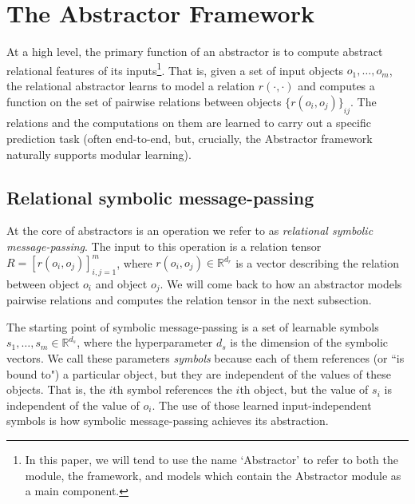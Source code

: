 
\def\m{m}


\section{The Abstractor Framework}
\label{sec:abstractor_framework}

At a high level, the primary function of an abstractor is to compute abstract relational features of its
inputs\footnote{In this paper, we will tend to use the name `Abstractor' to refer to both the module, the framework, and models which contain the Abstractor module as a main component.}. That is, given a set of input objects $o_1, \ldots, o_\m$, the relational abstractor learns to model a relation $r(\cdot, \cdot)$ and computes a function on
the set of pairwise relations between objects ${\{ r(o_i, o_j) \}}_{ij}$. The relations and the computations on them are learned to carry out a specific prediction task (often end-to-end, but, crucially, the Abstractor framework naturally supports modular learning).
\subsection{Relational symbolic message-passing}
\label{ssec:message_passing}

At the core of abstractors is an operation we refer to as \textit{relational symbolic message-passing}.
The input to this operation is a relation tensor $R = \left[r(o_i, o_j)\right]_{i,j=1}^\m$, where $r(o_i, o_j) \in \mathbb{R}^{d_r}$ is a vector describing the relation between object $o_i$ and object $o_j$. We will come back to how an abstractor models pairwise relations and computes the relation tensor in the next subsection.

The starting point of symbolic message-passing is a set of learnable symbols $s_1, \ldots, s_\m \in \mathbb{R}^{d_s}$, where the hyperparameter $d_s$ is the dimension of the symbolic vectors. We call these parameters \textit{symbols} because each of them references (or ``is bound to") a particular object, but they are independent of the values of these objects. That is, the $i$th symbol references the $i$th object, but the value of $s_i$ is independent of the value of $o_i$. The use of those learned input-independent symbols is how symbolic message-passing achieves its abstraction.

